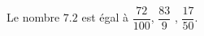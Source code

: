 
\begin{exercice}\label{exosmath-0792}

    Le nombre \( 7.2\) est égal à \( \dfrac{ 72 }{ 100 }\), $\dfrac{ 83 }{ 9 }$ , \( \dfrac{ 17 }{ 50 }\).

\end{exercice}
